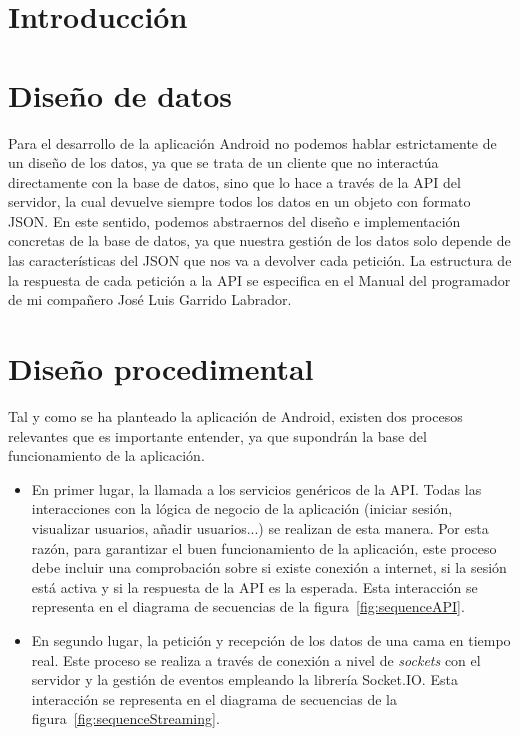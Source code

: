 
\section{Introducción}

\section{Diseño de datos}

Para el desarrollo de la aplicación Android no podemos hablar estrictamente de un diseño de los datos, ya que se trata de un cliente que no interactúa directamente con la base de datos, sino que lo hace a través de la API del servidor, la cual devuelve siempre todos los datos en un objeto con formato JSON. En este sentido, podemos abstraernos del diseño e implementación concretas de la base de datos, ya que nuestra gestión de los datos solo depende de las características del JSON que nos va a devolver cada petición. La estructura de la respuesta de cada petición a la API se especifica en el Manual del programador de mi compañero José Luis Garrido Labrador. 

\section{Diseño procedimental}

Tal y como se ha planteado la aplicación de Android, existen dos procesos relevantes que es importante entender, ya que supondrán la base del funcionamiento de la aplicación. 

\begin{itemize}
	\item En primer lugar, la llamada a los servicios genéricos de la API. Todas las interacciones con la lógica de negocio de la aplicación (iniciar sesión, visualizar usuarios, añadir usuarios...) se realizan de esta manera. Por esta razón, para garantizar el buen funcionamiento de la aplicación, este proceso debe incluir una comprobación sobre si existe conexión a internet, si la sesión está activa y si la respuesta de la API es la esperada. Esta interacción se representa en el diagrama de secuencias de la figura~\ref{fig:sequenceAPI}. 
	\item En segundo lugar, la petición y recepción de los datos de una cama en tiempo real. Este proceso se realiza a través de conexión a nivel de \textit{sockets} con el servidor y la gestión de eventos empleando la librería Socket.IO. Esta interacción se representa en el diagrama de secuencias de la figura~\ref{fig:sequenceStreaming}. 
\end{itemize}

